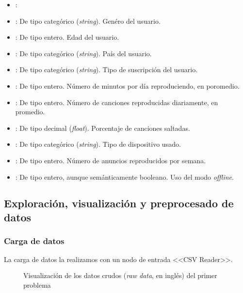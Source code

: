     \begin{itemize}
        \item {}:
        \item {}: De tipo categórico (\textit{string}). Genéro del usuario.
        \item {}: De tipo entero. Edad del usuario.
        \item {}: De tipo categórico (\textit{string}). País del usuario. 
        \item {}: De tipo categórico (\textit{string}). Tipo de suscripción del usuario.
        \item {}: De tipo entero. Número de minutos por día reproduciendo, en poromedio. 
        \item {}: De tipo entero. Número de canciones reproducidas diariamente, en promedio.
        \item {}: De tipo decimal (\textit{float}). Porcentaje de canciones saltadas. 
        \item {}: De tipo categórico (\textit{string}). Tipo de dispositivo usado. 
        \item {}: De tipo entero. Número de anuncios reproducidos por semana.
        \item {}: De tipo entero, aunque semánticamente booleano. Uso del modo \textit{offline}. 
    \end{itemize}


\subsection{Exploración, visualización y preprocesado de datos}

\subsubsection{Carga de datos}

La carga de datos la realizamos con un nodo de entrada <<CSV Reader>>.

\begin{figure}[h!]
    \caption{
        Visualización de los datos crudos (\textit{raw data}, en inglés) del primer problema
    }
    \label{fig:spotify_churn_CSVReader_RawData}
\end{figure}

